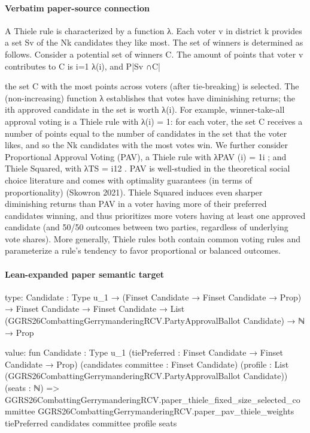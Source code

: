 \documentclass[10pt]{article}
\begin{document}
\paragraph{Verbatim paper-source connection}
\begin{ReviewVerbatim}
A Thiele rule is characterized by a function λ. Each voter v in district k provides a set Sv
of the Nk candidates they like most. The set of winners is determined as follows. Consider a
potential set of winners C. The amount of points that voter v contributes to C is i=1         λ(i), and
                                                                                     P|Sv ∩C|

the set C with the most points across voters (after tie-breaking) is selected. The (non-increasing)
function λ establishes that votes have diminishing returns; the ith approved candidate in the set is
worth λ(i). For example, winner-take-all approval voting is a Thiele rule with λ(i) = 1: for each
voter, the set C receives a number of points equal to the number of candidates in the set that the
voter likes, and so the Nk candidates with the most votes win. We further consider Proportional
Approval Voting (PAV), a Thiele rule with λPAV (i) = 1i ; and Thiele Squared, with λTS = i12 . PAV
is well-studied in the theoretical social choice literature and comes with optimality guarantees (in
terms of proportionality) (Skowron 2021). Thiele Squared induces even sharper diminishing returns
than PAV in a voter having more of their preferred candidates winning, and thus prioritizes more
voters having at least one approved candidate (and 50/50 outcomes between two parties, regardless
of underlying vote shares). More generally, Thiele rules both contain common voting rules and
parameterize a rule’s tendency to favor proportional or balanced outcomes.
\end{ReviewVerbatim}



\paragraph{Lean-expanded paper semantic target}
\begin{ReviewVerbatim}
type:
{Candidate : Type u_1} →
  (Finset Candidate → Finset Candidate → Prop) →
    Finset Candidate →
      Finset Candidate → List (GGRS26CombattingGerrymanderingRCV.PartyApprovalBallot Candidate) → ℕ → Prop

value:
fun {Candidate : Type u_1} (tiePreferred : Finset Candidate → Finset Candidate → Prop)
    (candidates committee : Finset Candidate)
    (profile : List (GGRS26CombattingGerrymanderingRCV.PartyApprovalBallot Candidate)) (seats : ℕ) =>
  GGRS26CombattingGerrymanderingRCV.paper_thiele_fixed_size_selected_committee
    GGRS26CombattingGerrymanderingRCV.paper_pav_thiele_weights tiePreferred candidates committee profile seats
\end{ReviewVerbatim}
\end{document}
